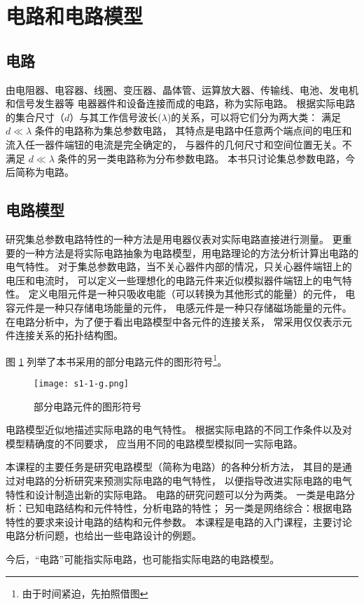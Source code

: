 \section{电路和电路模型}

\subsection{电路}
由电阻器、电容器、线圈、变压器、晶体管、运算放大器、传输线、电池、发电机和信号发生器等
电器器件和设备连接而成的电路，称为实际电路。
根据实际电路的集合尺寸（$d$）与其工作信号波长($\lambda$)的关系，可以将它们分为两大类：
满足 $d\ll\lambda$ 条件的电路称为集总参数电路，
其特点是电路中任意两个端点间的电压和流入任一器件端钮的电流是完全确定的，
与器件的几何尺寸和空间位置无关。不满足 $d\ll\lambda$ 条件的另一类电路称为分布参数电路。
本书只讨论集总参数电路，今后简称为电路。

\subsection{电路模型}
研究集总参数电路特性的一种方法是用电器仪表对实际电路直接进行测量。
更重要的一种方法是将实际电路抽象为电路模型，用电路理论的方法分析计算出电路的电气特性。
对于集总参数电路，当不关心器件内部的情况，只关心器件端钮上的电压和电流时，
可以定义一些理想化的电路元件来近似模拟器件端钮上的电气特性。
定义电阻元件是一种只吸收电能（可以转换为其他形式的能量）的元件，
电容元件是一种只存储电场能量的元件，
电感元件是一种只存储磁场能量的元件。
在电路分析中，为了便于看出电路模型中各元件的连接关系，
常采用仅仅表示元件连接关系的拓扑结构图。

图 \ref{fig:fig1_1_1} 列举了本书采用的部分电路元件的图形符号\footnote{由于时间紧迫，先拍照借图}。

\begin{figure}[htbp]
\centering
\texttt{[image: s1-1-g.png]}
\caption{部分电路元件的图形符号}\label{fig:fig1_1_1}
\end{figure}

电路模型近似地描述实际电路的电气特性。
根据实际电路的不同工作条件以及对模型精确度的不同要求，
应当用不同的电路模型模拟同一实际电路。

本课程的主要任务是研究电路模型（简称为电路）的各种分析方法，
其目的是通过对电路的分析研究来预测实际电路的电气特性，
以便指导改进实际电路的电气特性和设计制造出新的实际电路。
电路的研究问题可以分为两类。
一类是电路分析：已知电路结构和元件特性，分析电路的特性；
另一类是网络综合：根据电路特性的要求来设计电路的结构和元件参数。
本课程是电路的入门课程，主要讨论电路分析问题，也给出一些电路设计的例题。

今后，“电路”可能指实际电路，也可能指实际电路的电路模型。
